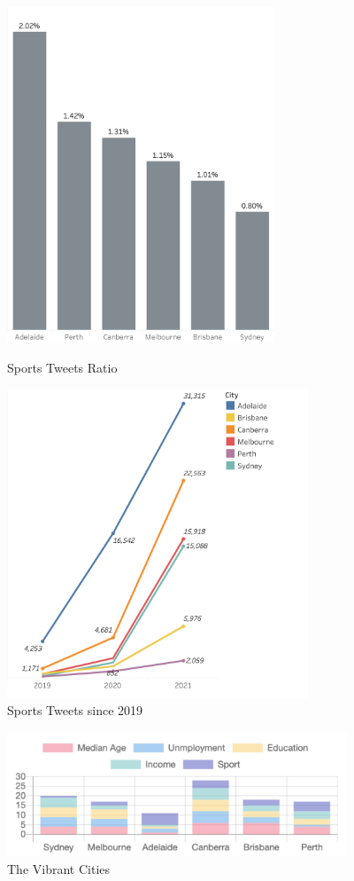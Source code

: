 \begin{figure}[h!]
\centering
\begin{minipage}[t]{0.48\textwidth}
\centering
\includegraphics[width=8cm]{Figures/sports rate.png}
    \caption{Sports Tweets Ratio}
    \label{fig:sports ratio}
\end{minipage}
\begin{minipage}[t]{0.5\textwidth}
\centering
\includegraphics[width=9cm]{Figures/2019-2021.png}
    \caption{Sports Tweets since 2019}
    \label{fig:sports tweets since 2019}
\end{minipage}
\end{figure}

\begin{figure}[h!]
\centerline{\includegraphics[width=4in]{Figures/vibrant city.png}}
\caption{The Vibrant Cities\label{vibrant result}}
\end{figure}

